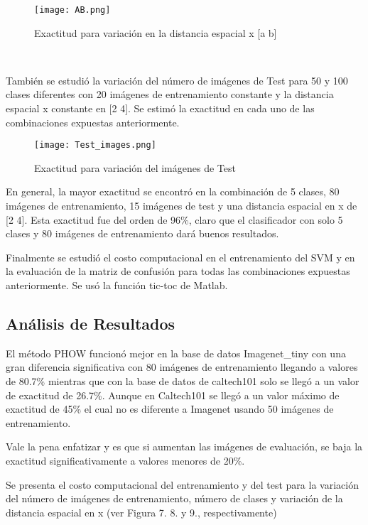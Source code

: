 \documentclass[10pt,twocolumn,letterpaper]{article}
\begin{document}
\begin{figure}[ht]
\centering

 \texttt{[image: AB.png]}
 \caption{Exactitud para variación en la distancia espacial x [a b]}

\end{figure}\


También se estudió la variación del número de imágenes de Test para  50 y 100 clases diferentes con 20 imágenes de entrenamiento constante y la distancia espacial x constante en [2 4]. Se estimó la exactitud en cada uno de las combinaciones expuestas anteriormente. 
 
\begin{figure}[ht]
\centering

 \texttt{[image: Test\_images.png]}
 \caption{Exactitud para variación del imágenes de Test}

\end{figure}

En general, la mayor exactitud se encontró en la combinación de 5 clases, 80 imágenes de entrenamiento, 15 imágenes de test y una distancia espacial en x de [2 4]. Esta exactitud fue del orden de 96\%, claro que el clasificador con solo 5 clases y 80 imágenes de entrenamiento dará buenos resultados.

Finalmente se estudió el costo computacional en el entrenamiento del SVM y en la evaluación de la matriz de confusión para todas las combinaciones expuestas anteriormente. Se usó la función tic-toc de Matlab. 

\subsection{Análisis de Resultados}

El método PHOW funcionó mejor en la base de datos Imagenet\_tiny con una gran diferencia significativa con 80 imágenes de entrenamiento llegando a valores de 80.7\% mientras que con la base de datos de caltech101 solo se llegó a un valor de exactitud de 26.7\%. Aunque en Caltech101 se llegó a un valor máximo de exactitud de 45\% el cual no es diferente a Imagenet usando 50 imágenes de entrenamiento. 

Vale la pena enfatizar y es que si aumentan las imágenes de evaluación, se baja la exactitud significativamente a valores menores de 20\%.

Se presenta el costo computacional del entrenamiento y del test para la variación del número de imágenes de entrenamiento, número de clases y variación de la distancia espacial en x (ver Figura 7. 8. y 9., respectivamente)
\end{document}
